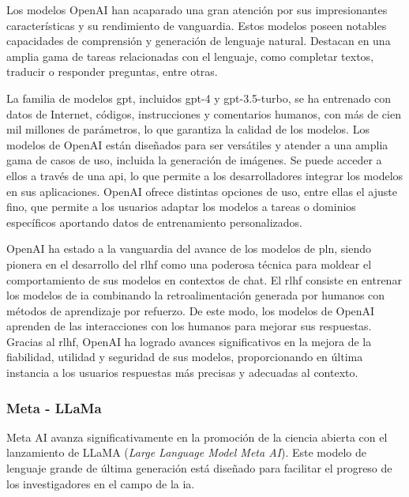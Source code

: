 Los modelos OpenAI han acaparado una gran atención por sus impresionantes características y su rendimiento de vanguardia. Estos modelos poseen notables capacidades de comprensión y generación de lenguaje natural. Destacan en una amplia gama de tareas relacionadas con el lenguaje, como completar textos, traducir o responder preguntas, entre otras.

La familia de modelos \acrshort{gpt}, incluidos gpt-4 y gpt-3.5-turbo, se ha entrenado con datos de Internet, códigos, instrucciones y comentarios humanos, con más de cien mil millones de parámetros, lo que garantiza la calidad de los modelos. Los modelos de OpenAI están diseñados para ser versátiles y atender a una amplia gama de casos de uso, incluida la generación de imágenes. Se puede acceder a ellos a través de una \acrshort{api}, lo que permite a los desarrolladores integrar los modelos en sus aplicaciones. OpenAI ofrece distintas opciones de uso, entre ellas el ajuste fino, que permite a los usuarios adaptar los modelos a tareas o dominios específicos aportando datos de entrenamiento personalizados.


OpenAI ha estado a la vanguardia del avance de los modelos de \acrfull{pln}, siendo pionera en el desarrollo del \acrfull{rlhf} como una poderosa técnica para moldear el comportamiento de sus modelos en contextos de chat. El \acrshort{rlhf} consiste en entrenar los modelos de \acrshort{ia} combinando la retroalimentación generada por humanos con métodos de aprendizaje por refuerzo. De este modo, los modelos de OpenAI aprenden de las interacciones con los humanos para mejorar sus respuestas. Gracias al \acrshort{rlhf}, OpenAI ha logrado avances significativos en la mejora de la fiabilidad, utilidad y seguridad de sus modelos, proporcionando en última instancia a los usuarios respuestas más precisas y adecuadas al contexto.

\subsubsection{Meta - LLaMa}

Meta AI avanza significativamente en la promoción de la ciencia abierta con el lanzamiento de LLaMA (\textit{Large Language Model Meta AI}). Este modelo de lenguaje grande de última generación está diseñado para facilitar el progreso de los investigadores en el campo de la \acrshort{ia}.

